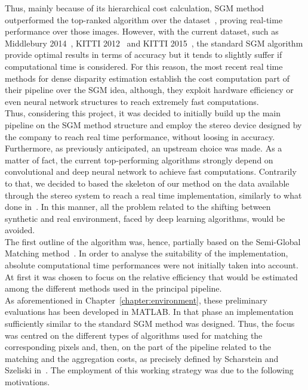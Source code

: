 Thus, mainly because of its hierarchical cost calculation, SGM method outperformed the top-ranked algorithm over the dataset~\cite{scharstein2003high}, proving real-time performance over those images. 
However, with the current dataset, such as Middlebury 2014~\cite{Scharstein2014}, KITTI 2012~\cite{geiger2013vision} and KITTI 2015~\cite{menze2015object}, the standard SGM algorithm provide optimal results in terms of accuracy but it tends to slightly suffer if computational time is considered.
For this reason, the most recent real time methods for dense disparity estimation establish the cost computation part of their pipeline over the SGM idea, although, they exploit hardware efficiency or even neural network structures to reach extremely fast computations.\\
Thus, considering this project, it was decided to initially build up the main pipeline on the SGM method structure and employ the stereo device designed by the company to reach real time performance, without loosing in accuracy. 
Furthermore, as previously anticipated, an upstream choice was made. 
As a matter of fact, the current top-performing algorithms strongly depend on convolutional and deep neural network to achieve fast computations.
Contrarily to that, we decided to based the skeleton of our method on the data available through the stereo system to reach a real time implementation, similarly to what done in~\cite{Keselman2017}.
In this manner, all the problem related to the shifting between synthetic and real environment, faced by deep learning algorithms, would be avoided. \\
The first outline of the algorithm was, hence, partially based on the Semi-Global Matching method~\cite{Hirschmuller2008}. 
In order to analyse the suitability of the implementation, absolute computational time performances were not initially taken into account. 
At first it was chosen to focus on the relative efficiency that would be estimated among the different methods used in the principal pipeline.\\
As aforementioned in Chapter~\ref{chapter:environment}, these preliminary evaluations has been developed in MATLAB. 
In that phase an implementation sufficiently similar to the standard SGM method was designed. 
Thus, the focus was centred on the different types of algorithms used for matching the corresponding pixels and, then, on the part of the pipeline related to the matching and the aggregation costs, as precisely defined by Scharstein and Szeliski in~\cite{Scharstein2001}.
The employment of this working strategy was due to the following motivations. 
